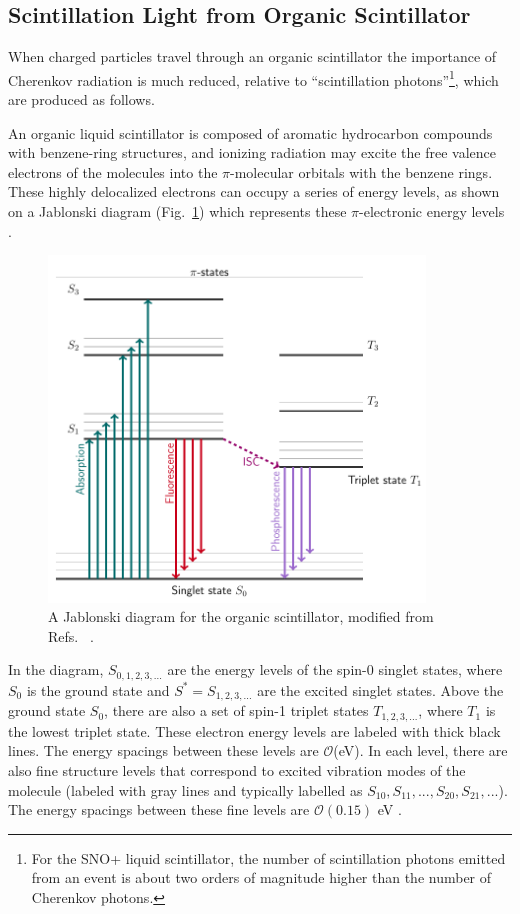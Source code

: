 \subsection{Scintillation Light from Organic Scintillator}\label{sect:scintillator}

When charged particles travel through an organic scintillator the importance of Cherenkov radiation is much reduced, relative to ``scintillation photons''\footnote{For the SNO+ liquid scintillator, the number of scintillation photons emitted from an event is about two orders of magnitude higher than the number of Cherenkov photons\cite{kaptanoglu2020reactor}.}, which are produced as follows. 

An organic liquid scintillator is composed of aromatic hydrocarbon compounds with benzene-ring structures, and ionizing radiation may excite the free valence electrons of the molecules into the $\pi$-molecular orbitals with the benzene rings. These highly delocalized electrons can occupy a series of energy levels, as shown on a Jablonski diagram (Fig.~\ref{jablonski}) which represents these $\pi$-electronic energy levels \cite{leo2012techniques,knoll2010radiation}. 
\begin{figure}[!htb]
	\centering
	\includegraphics[width=10cm]{jablonski.png}
	\caption[A Jablonski diagram for the organic scintillator.]{A Jablonski diagram for the organic scintillator, modified from Refs.~ \cite{ knoll2010radiation,birks1965theory}.}
	\label{jablonski}
\end{figure}
In the diagram, $S_{0,1,2,3,...}$ are the energy levels of the spin-0 singlet states, where $S_0$ is the ground state and $S^*=S_{1,2,3,...}$ are the excited singlet states. Above the ground state $S_0$, there are also a set of spin-1 triplet states $T_{1,2,3,...}$, where $T_1$ is the lowest triplet state. These electron energy levels are labeled with thick black lines. The energy spacings between these levels are $\mathcal{O}$(eV). In each level, there are also fine structure levels that correspond to excited vibration modes of the molecule (labeled with gray lines and typically labelled as $S_{10}, S_{11}, ..., S_{20}, S_{21}, ...$). The energy spacings between these fine levels are $\mathcal{O}(0.15)$ eV \cite{leo2012techniques, knoll2010radiation}.

